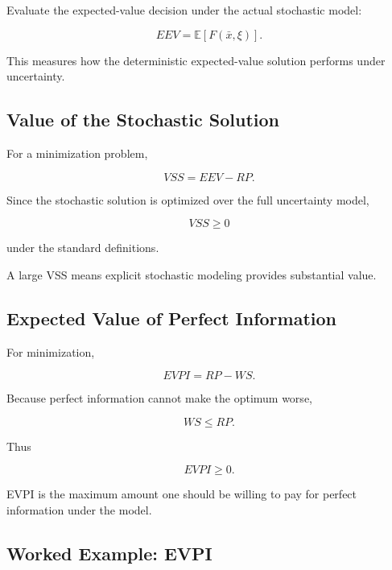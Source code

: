 Evaluate the expected-value decision under the actual stochastic model:

\[
\boxed{
EEV
=
\mathbb{E}
[
F(\bar{x},\xi)
].
}
\]

This measures how the deterministic expected-value solution performs under
uncertainty.

\subsection{Value of the Stochastic Solution}
\label{subsec:value-of-stochastic-solution}

For a minimization problem,

\[
\boxed{
VSS
=
EEV-RP.
}
\]

Since the stochastic solution is optimized over the full uncertainty
model,

\[
\boxed{
VSS\geq0
}
\]

under the standard definitions.

A large VSS means explicit stochastic modeling provides substantial value.

\subsection{Expected Value of Perfect Information}
\label{subsec:expected-value-perfect-information}

For minimization,

\[
\boxed{
EVPI
=
RP-WS.
}
\]

Because perfect information cannot make the optimum worse,

\[
\boxed{
WS\leq RP.
}
\]

Thus

\[
\boxed{
EVPI\geq0.
}
\]

EVPI is the maximum amount one should be willing to pay for perfect
information under the model.

\subsection{Worked Example: EVPI}
\label{subsec:worked-evpi}

